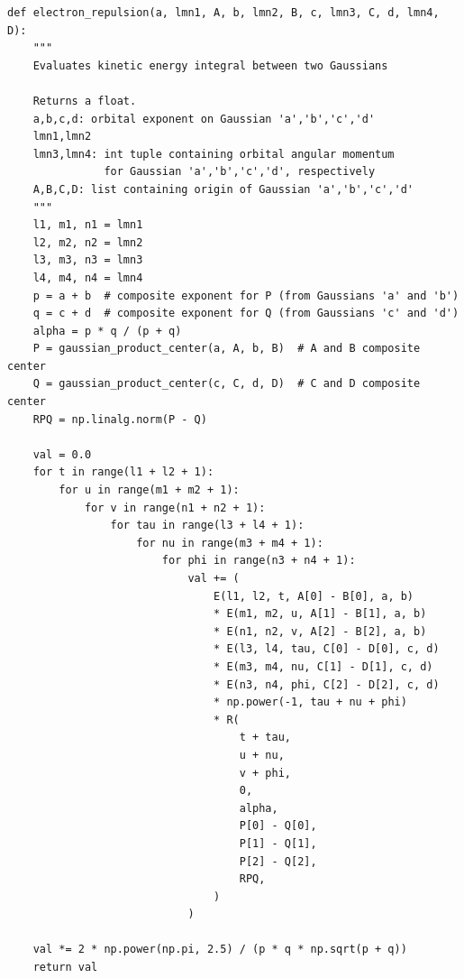 \vspace{5pt}

\begin{lstlisting}[style=MyPython]
def electron_repulsion(a, lmn1, A, b, lmn2, B, c, lmn3, C, d, lmn4, D):
    """
    Evaluates kinetic energy integral between two Gaussians

    Returns a float.
    a,b,c,d: orbital exponent on Gaussian 'a','b','c','d'
    lmn1,lmn2
    lmn3,lmn4: int tuple containing orbital angular momentum
               for Gaussian 'a','b','c','d', respectively
    A,B,C,D: list containing origin of Gaussian 'a','b','c','d'
    """
    l1, m1, n1 = lmn1
    l2, m2, n2 = lmn2
    l3, m3, n3 = lmn3
    l4, m4, n4 = lmn4
    p = a + b  # composite exponent for P (from Gaussians 'a' and 'b')
    q = c + d  # composite exponent for Q (from Gaussians 'c' and 'd')
    alpha = p * q / (p + q)
    P = gaussian_product_center(a, A, b, B)  # A and B composite center
    Q = gaussian_product_center(c, C, d, D)  # C and D composite center
    RPQ = np.linalg.norm(P - Q)

    val = 0.0
    for t in range(l1 + l2 + 1):
        for u in range(m1 + m2 + 1):
            for v in range(n1 + n2 + 1):
                for tau in range(l3 + l4 + 1):
                    for nu in range(m3 + m4 + 1):
                        for phi in range(n3 + n4 + 1):
                            val += (
                                E(l1, l2, t, A[0] - B[0], a, b)
                                * E(m1, m2, u, A[1] - B[1], a, b)
                                * E(n1, n2, v, A[2] - B[2], a, b)
                                * E(l3, l4, tau, C[0] - D[0], c, d)
                                * E(m3, m4, nu, C[1] - D[1], c, d)
                                * E(n3, n4, phi, C[2] - D[2], c, d)
                                * np.power(-1, tau + nu + phi)
                                * R(
                                    t + tau,
                                    u + nu,
                                    v + phi,
                                    0,
                                    alpha,
                                    P[0] - Q[0],
                                    P[1] - Q[1],
                                    P[2] - Q[2],
                                    RPQ,
                                )
                            )

    val *= 2 * np.power(np.pi, 2.5) / (p * q * np.sqrt(p + q))
    return val
\end{lstlisting}

